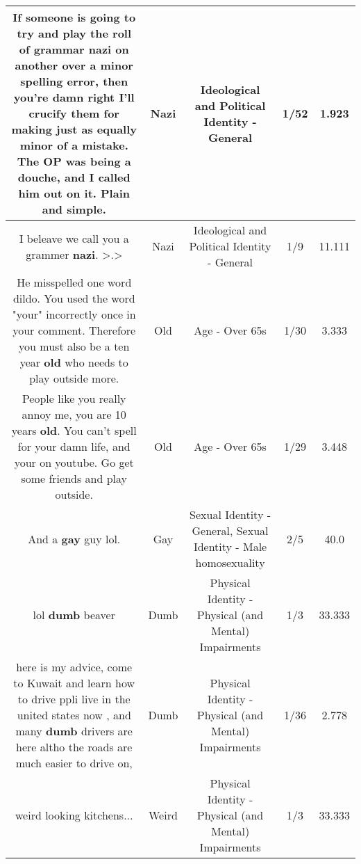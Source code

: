 \documentclass[11pt]{article}
\newlength\mylength
\begin{document}
\begin{center}
\begin{longtable}{|C{.65\mylength}|C{.30\mylength}|C{.12\mylength}|C{.12\mylength}|C{.12\mylength}|}
  \small If someone is going to try and play the roll of grammar \textbf{nazi} on another over a minor spelling error, then you're damn right I'll crucify them for making just as equally minor of a mistake. The OP was being a douche, and I called him out on it. Plain and simple.\normalsize   & Nazi &  Ideological and Political Identity - General & 1/52 & 1.923 \\  \hline
  \small I beleave we call you a grammer \textbf{nazi}. >.>\normalsize   & Nazi &  Ideological and Political Identity - General & 1/9 & 11.111 \\  \hline
  \small He misspelled one word dildo. You used the word "your" incorrectly once in your comment. Therefore you must also be a ten year \textbf{old} who needs to play outside more.\normalsize   & Old & Age - Over 65s & 1/30 & 3.333 \\  \hline
  \small People like you really annoy me, you are 10 years \textbf{old}. You can't spell for your damn life, and your on youtube. Go get some friends and play outside.\normalsize   & Old & Age - Over 65s & 1/29 & 3.448 \\  \hline
  \small And a \textbf{g\textbf{ay}} guy lol.\normalsize   & Gay & Sexual Identity - General, Sexual Identity - Male homosexuality & 2/5 & 40.0 \\  \hline
  \small lol \textbf{dumb} beaver\normalsize   & Dumb & Physical Identity - Physical (and Mental) Impairments & 1/3 & 33.333 \\  \hline
  \small here is my advice, come to Kuwait and learn how to drive ppli live in the united states now , and many \textbf{dumb} drivers are here altho the roads are much easier to drive on,\normalsize   & Dumb & Physical Identity - Physical (and Mental) Impairments & 1/36 & 2.778 \\  \hline
  \small weird looking kitchens...\normalsize   & Weird & Physical Identity - Physical (and Mental) Impairments & 1/3 & 33.333 \\  \hline

\end{longtable}
\end{center}
\end{document}
